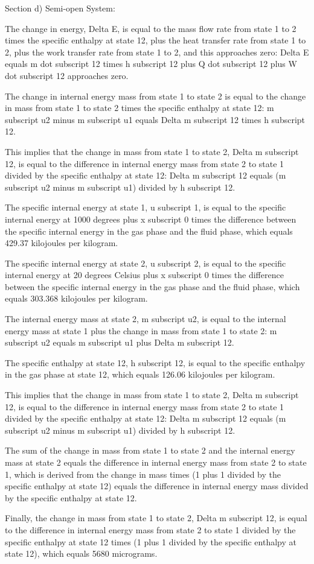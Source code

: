 Section d) Semi-open System:

The change in energy, Delta E, is equal to the mass flow rate from state 1 to 2 times the specific enthalpy at state 12, plus the heat transfer rate from state 1 to 2, plus the work transfer rate from state 1 to 2, and this approaches zero:
Delta E equals m dot subscript 12 times h subscript 12 plus Q dot subscript 12 plus W dot subscript 12 approaches zero.

The change in internal energy mass from state 1 to state 2 is equal to the change in mass from state 1 to state 2 times the specific enthalpy at state 12:
m subscript u2 minus m subscript u1 equals Delta m subscript 12 times h subscript 12.

This implies that the change in mass from state 1 to state 2, Delta m subscript 12, is equal to the difference in internal energy mass from state 2 to state 1 divided by the specific enthalpy at state 12:
Delta m subscript 12 equals (m subscript u2 minus m subscript u1) divided by h subscript 12.

The specific internal energy at state 1, u subscript 1, is equal to the specific internal energy at 1000 degrees plus x subscript 0 times the difference between the specific internal energy in the gas phase and the fluid phase, which equals 429.37 kilojoules per kilogram.

The specific internal energy at state 2, u subscript 2, is equal to the specific internal energy at 20 degrees Celsius plus x subscript 0 times the difference between the specific internal energy in the gas phase and the fluid phase, which equals 303.368 kilojoules per kilogram.

The internal energy mass at state 2, m subscript u2, is equal to the internal energy mass at state 1 plus the change in mass from state 1 to state 2:
m subscript u2 equals m subscript u1 plus Delta m subscript 12.

The specific enthalpy at state 12, h subscript 12, is equal to the specific enthalpy in the gas phase at state 12, which equals 126.06 kilojoules per kilogram.

This implies that the change in mass from state 1 to state 2, Delta m subscript 12, is equal to the difference in internal energy mass from state 2 to state 1 divided by the specific enthalpy at state 12:
Delta m subscript 12 equals (m subscript u2 minus m subscript u1) divided by h subscript 12.

The sum of the change in mass from state 1 to state 2 and the internal energy mass at state 2 equals the difference in internal energy mass from state 2 to state 1, which is derived from the change in mass times (1 plus 1 divided by the specific enthalpy at state 12) equals the difference in internal energy mass divided by the specific enthalpy at state 12.

Finally, the change in mass from state 1 to state 2, Delta m subscript 12, is equal to the difference in internal energy mass from state 2 to state 1 divided by the specific enthalpy at state 12 times (1 plus 1 divided by the specific enthalpy at state 12), which equals 5680 micrograms.